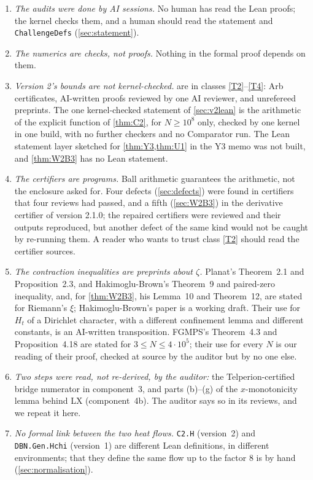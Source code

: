 \documentclass[11pt]{article}
\theoremstyle{definition}
\newcommand{\lean}[1]{\texttt{#1}}
\begin{document}
\begin{enumerate}
\item \emph{The audits were done by AI sessions.} No human has read the Lean proofs; the kernel checks them, and a human should read the statement and \lean{ChallengeDefs} (\cref{sec:statement}).
\item \emph{The numerics are checks, not proofs.} Nothing in the formal proof depends on them.
\item \emph{Version 2's bounds are not kernel-checked.}  are in classes \ref{T2}--\ref{T4}: Arb certificates, AI-written proofs reviewed by one AI reviewer, and unrefereed preprints. The one kernel-checked statement of \cref{sec:v2lean} is the arithmetic of the explicit function of \cref{thm:C2}, for $N \ge 10^8$ only, checked by one kernel in one build, with no further checkers and no Comparator run. The Lean statement layer sketched for \cref{thm:Y3,thm:U1} in the Y3 memo was not built, and \cref{thm:W2B3} has no Lean statement.
\item \emph{The certifiers are programs.} Ball arithmetic guarantees the arithmetic, not the enclosure asked for. Four defects (\cref{sec:defects}) were found in certifiers that four reviews had passed, and a fifth (\cref{sec:W2B3}) in the derivative certifier of version 2.1.0; the repaired certifiers were reviewed and their outputs reproduced, but another defect of the same kind would not be caught by re-running them. A reader who wants to trust class \ref{T2} should read the certifier sources.
\item \emph{The contraction inequalities are preprints about $\zeta$.} Planat's Theorem~2.1 and Proposition~2.3, and Hakimoglu-Brown's Theorem~9 and paired-zero inequality, and, for \cref{thm:W2B3}, his Lemma~10 and Theorem~12, are stated for Riemann's $\xi$; Hakimoglu-Brown's paper is a working draft. Their use for $H_t$ of a Dirichlet character, with a different confinement lemma and different constants, is an AI-written transposition. FGMPS's Theorem~4.3 and Proposition~4.18 are stated for $3 \le N \le 4\cdot10^5$; their use for every $N$ is our reading of their proof, checked at source by the auditor but by no one else.
\item \emph{Two steps were read, not re-derived, by the auditor:} the Telperion-certified bridge numerator in component~3, and parts (b)--(g) of the $x$-monotonicity lemma behind LX (component~4b). The auditor says so in its reviews, and we repeat it here.
\item \emph{No formal link between the two heat flows.} \lean{C2.H} (version~2) and \lean{DBN.Gen.Hchi} (version~1) are different Lean definitions, in different environments; that they define the same flow up to the factor $8$ is by hand (\cref{sec:normalisation}).

\end{enumerate}
\end{document}
